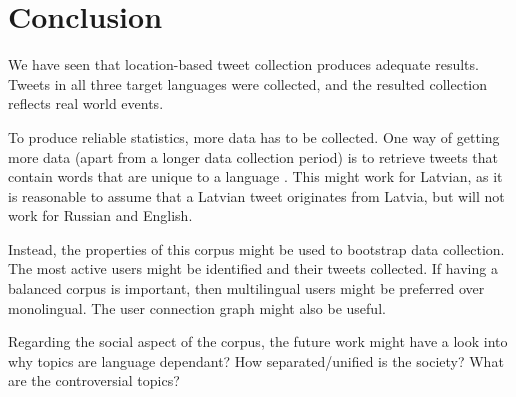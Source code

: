 \documentclass[11pt,a4paper]{article}
\begin{document}
\section{Conclusion}

We have seen that location-based tweet collection produces adequate results. Tweets in all three target languages were collected, and the resulted collection reflects real world events.

To produce reliable statistics, more data has to be collected. One way of getting more data (apart from a longer data collection period) is to retrieve tweets that contain words that are unique to a language \cite{sang2013}. This might work for Latvian, as it is reasonable to assume that a Latvian tweet originates from Latvia, but will not work for Russian and English.

Instead, the properties of this corpus might be used to bootstrap data collection. The most active users might be identified and their tweets collected. If having a balanced corpus is important, then multilingual users might be preferred over monolingual. The user connection graph might also be useful.

Regarding the social aspect of the corpus, the future work might have a look into why topics are language dependant? How separated/unified is the society? What are the controversial topics?



\end{document}
